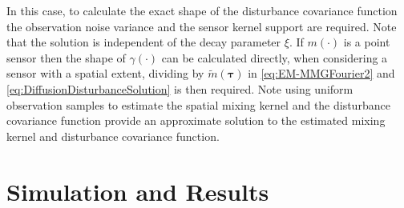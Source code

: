 \documentclass[10pt,twocolumn,twoside]{IEEEtran}
\begin{document}
In this case, to calculate the exact shape of the disturbance covariance function the observation noise variance and the sensor kernel support are required. Note that the solution is independent of the decay parameter $\xi$. If $m(\cdot)$ is a point sensor then the shape of $\gamma(\cdot)$ can be calculated directly, when considering a sensor with a spatial extent, dividing by $\tilde{m}(\boldsymbol\tau)$ in \eqref{eq:EM-MMGFourier2} and \eqref{eq:DiffusionDisturbanceSolution}  is then required. 
Note using uniform observation samples to estimate the spatial mixing kernel and the disturbance covariance function provide an approximate solution to the estimated  mixing kernel and disturbance covariance function. 
\section{Simulation and Results}   
\end{document}
